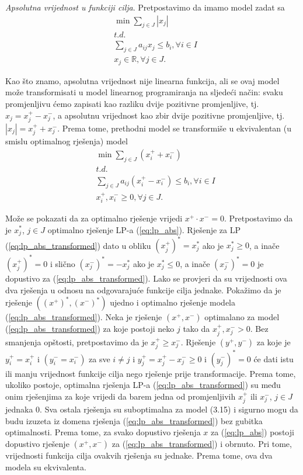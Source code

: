 \documentclass[a4paper, utf8, 11pt, colorlinks]{book}
\theoremstyle{definition}
\begin{document}
\emph{Apsolutna vrijednost u funkciji cilja}.   Pretpostavimo da imamo model zadat sa 
\begin{align}
	&\min \sum_{j \in J}   |x_j| \nonumber \\
	& t.d. \nonumber \\
	& \sum_{j\in J} a_{ij} x_j \leq b_i, \forall i\in I  \nonumber \\
	& x_j \in \mathbb{R}, \forall j \in J. \label{eq:lp_abs}
\end{align} 
 
Kao što znamo, apsolutna vrijednost nije linearna funkcija, ali se ovaj model može transformisati u model linearnog programiranja na sljedeći način: 
svaku   promjenljivu ćemo zapisati kao razliku dvije pozitivne promjenljive, tj.  $x_j = x_j^+ - x_j^-$, a apsolutnu vrijednost kao zbir dvije pozitivne promjenljive, tj. $|x_j|= x_j^+ + x_j^-$. Prema tome, prethodni model se transformiše  u ekvivalentan (u smislu optimalnog rješenja) model  
\begin{align}
	&\min \sum_{j \in J}  (x_i^+ + x_i^-) \nonumber \\
	& t.d. \nonumber \\
	&\sum_{j\in J} a_{ij} (  x_i^+ - x_i^- ) \leq b_i, \forall i \in I \nonumber \\
	&  x_i^+, x_i^- \geq 0, \forall j\in J. \label{eq:lp_abs_transformed}
\end{align}
 
 Može se pokazati da za optimalno rješenje vrijedi  $x^{+}\cdot x^{-}= 0$.  
   Pretpostavimo da je $x_j^*$, $j \in J$ optimalno rješenje LP-a (\ref{eq:lp_abs}). Rješenje za LP  (\ref{eq:lp_abs_transformed})  dato u obliku 
  $(x_j^+)^* = x_j^*$  ako je $x_j^* \geq 0$, a inače $(x_j^+)^* = 0$ i slično $(x_j^-)^* = - x_j^*$  ako je $x_j^* \leq 0$, a inače $(x_j^-)^* = 0$ je dopustivo za (\ref{eq:lp_abs_transformed}). Lako se provjeri da su vrijednosti ova dva rješenja u odnosu na odgovarajuće funkcije cilja jednake. Pokažimo da je rješenje  $((x^+)^*, (x^-)^*)$ ujedno i optimalno rješenje modela (\ref{eq:lp_abs_transformed}).   Neka je rješenje $(x^+, x^-)$ optimalano za model  (\ref{eq:lp_abs_transformed}) za koje postoji neko $j$ tako da  $x^{+}_j, x^{-}_j > 0$. Bez smanjenja opštosti, pretpostavimo da je $x^{+}_j \geq x^{-}_j$. 
  Rješenje $(y^+, y^-)$  za koje je $y^+_i = x^+_i$ i $(y^-_i = x^-_i)$ za sve $i \neq j$
   i $y^+_j = x^{+}_j - x^{-}_j \geq 0$ i $(y^-_j)^*=0$ će dati istu ili manju vrijednost funkcije cilja nego rješenje prije transformacije. Prema tome, ukoliko postoje, optimalna rješenja LP-a (\ref{eq:lp_abs_transformed}) su među onim rješenjima za koje vrijedi da  barem jedna od promjenljivih $x_j^+$ ili $x_j^-$, $j \in J$  jednaka 0. Sva ostala rješenja su suboptimalna za model (3.15) i sigurno mogu da budu izuzeta iz domena rješenja (\ref{eq:lp_abs_transformed}) bez gubitka optimalnosti.   Prema tome, za svako dopustivo rješenja $x$ za (\ref{eq:lp_abs}) postoji dopustivo rješenje  $(x^+, x^-)$ za (\ref{eq:lp_abs_transformed}) i obrnuto. Pri tome, vrijednosti funkcija cilja ovakvih rješenja su jednake. Prema tome, ova dva modela su ekvivalenta. 
\end{document}

